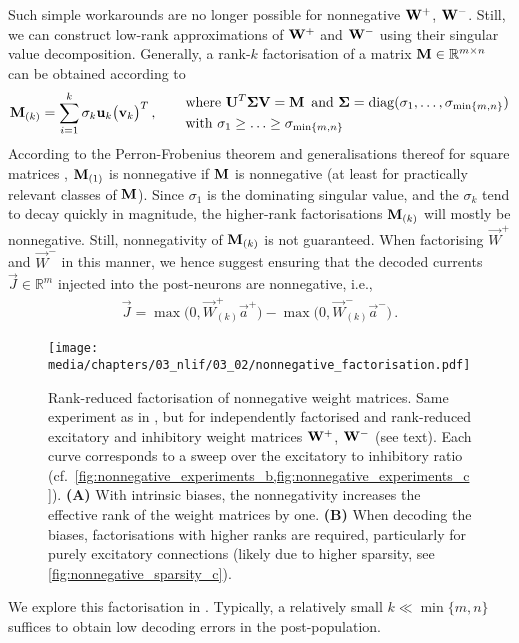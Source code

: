 Such simple workarounds are no longer possible for nonnegative $\mathbf{W}^+$, $\mathbf{W}^-$.
Still, we can construct low-rank approximations of $\mathbf{W}^+$ and $\mathbf{W}^-$ using their singular value decomposition.
Generally, a rank-$k$ factorisation of a matrix $\mathbf{M} \in \mathbb{R}^{m \times n}$ can be obtained according to
\begin{align}
	\mathbf{M}_{(k)} = \sum_{i = 1}^k \sigma_k \mathbf{u}_k \bigl(\mathbf{v}_k \bigr)^T \,, \quad\quad
	\begin{aligned}	
		&\text{where } \mathbf{U}^T \mathbf{\Sigma} \mathbf{V} = \mathbf{M} \,
		\text{ and } \mathbf{\Sigma} = \mathrm{diag}(\sigma_1, \ldots, \sigma_{\min\{m, n\}}) \\
		&\text{with }
	\sigma_1 \geq \ldots \geq \sigma_{\min\{m, n\}}
	\end{aligned}
	\label{eqn:svd_factorisation}
\end{align}
According to the Perron-Frobenius theorem and generalisations thereof for square matrices \citep{avin2013generalized}, $\mathbf{M}_{(1)}$ is nonnegative if $\mathbf{M}$ is nonnegative (at least for practically relevant classes of $\mathbf{M}$).
Since $\sigma_1$ is the dominating singular value, and the $\sigma_k$ tend to decay quickly in magnitude, the higher-rank factorisations $\mathbf{M}_{(k)}$ will mostly be nonnegative. Still, nonnegativity of $\mathbf{M}_{(k)}$ is not guaranteed.
When factorising $\vec W^+$ and $\vec W^-$ in this manner, we hence suggest ensuring that the decoded currents $\vec J \in \mathbb{R}^{m}$ injected into the post-neurons are nonnegative, i.e.,
\begin{align*}
	\vec J = \max\bigl(0, \vec W^+_{(k)} \vec a^+ \bigr) - \max\bigl(0, \vec W^-_{(k)} \vec a^- \bigr) \,.
\end{align*}%
\begin{figure}
	\texttt{[image: media/chapters/03\_nlif/03\_02/nonnegative\_factorisation.pdf]}
	\caption[Rank-reduced factorisation of nonnegative weight matrices]{Rank-reduced factorisation of nonnegative weight matrices. Same experiment as in , but for independently factorised and rank-reduced excitatory and inhibitory weight matrices $\mathbf{W}^+$, $\mathbf{W}^-$ (see text). Each curve corresponds to a sweep over the excitatory to inhibitory ratio (cf.~\cref{fig:nonnegative_experiments_b,fig:nonnegative_experiments_c}).
	\textbf{(A)} With intrinsic biases, the nonnegativity increases the effective rank of the weight matrices by one.
	\textbf{(B)} When decoding the biases, factorisations with higher ranks are required, particularly for purely excitatory connections (likely due to higher sparsity, see \cref{fig:nonnegative_sparsity_c}).}
	\label{fig:nonnegative_factorisation}
\end{figure}%
We explore this factorisation in .
Typically, a relatively small $k \ll \min\{m, n\}$ suffices to obtain low decoding errors in the post-population.

